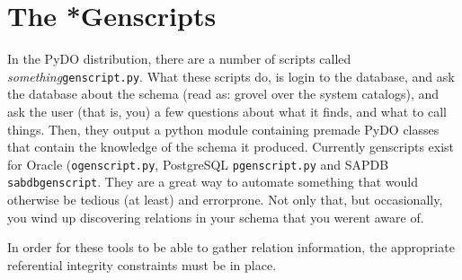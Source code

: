 \documentclass[titlepage]{manual}
\begin{document}
\chapter{The *Genscripts}
In the PyDO distribution, there are a number of scripts called
\emph{something}\texttt{genscript.py}.  What these scripts do, is
login to the database, and ask the database about the schema (read as:
grovel over the system catalogs), and ask the user (that is, you) a
few questions about what it finds, and what to call things.  Then,
they output a python module containing premade PyDO classes that
contain the knowledge of the schema it produced.  Currently genscripts
exist for Oracle (\texttt{ogenscript.py}, PostgreSQL
\texttt{pgenscript.py} and SAPDB \texttt{sabdbgenscript}.  They are a
great way to automate something that would otherwise be tedious (at
least) and errorprone.  Not only that, but occasionally, you wind up
discovering relations in your schema that you werent aware of.

In order for these tools to be able to gather relation information,
the appropriate referential integrity constraints must be in place.
\end{document}
